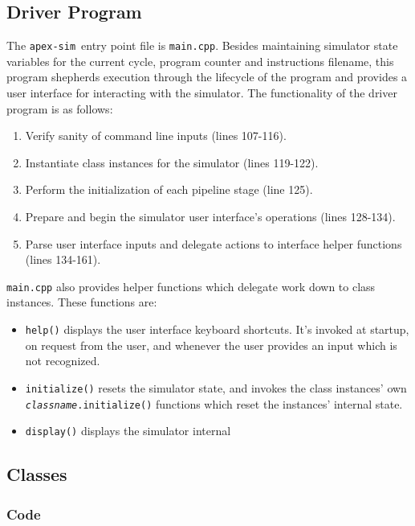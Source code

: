 \documentclass[12pt]{article}
\newcommand{\codename}[0]{\texttt{apex-sim}~}
\begin{document}
\subsection{Driver Program}
\label{sec:driver}
The \codename entry point file is \texttt{main.cpp}. Besides maintaining simulator state variables for the current cycle, program counter and instructions filename, this program shepherds execution through the lifecycle of the program and provides a user interface for interacting with the simulator. The functionality of the driver program is as follows:
\begin{enumerate}
  \item Verify sanity of command line inputs (lines 107-116).
  \item Instantiate class instances for the simulator (lines 119-122).
  \item Perform the initialization of each pipeline stage (line 125).
  \item Prepare and begin the simulator user interface's operations (lines 128-134).
  \item Parse user interface inputs and delegate actions to interface helper functions (lines 134-161).
\end{enumerate}

\texttt{main.cpp} also provides helper functions which delegate work down to class instances. These functions are:
\begin{itemize}
  \item \texttt{help()} displays the user interface keyboard shortcuts. It's invoked at startup, on request from the user, and whenever the user provides an input which is not recognized.
  \item \texttt{initialize()} resets the simulator state, and invokes the class instances' own \texttt{\textit{classname}.initialize()} functions which reset the instances' internal state.
  \item \texttt{display()} displays the simulator internal 
\end{itemize}



\subsection{Classes}
\label{sec:classes}

\subsubsection{Code}
\end{document}
